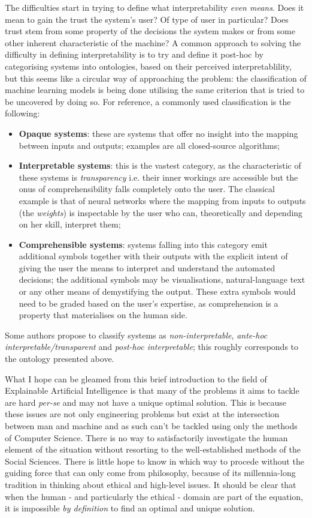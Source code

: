 \documentclass[mscthesis]{usiinfthesis}
\begin{document}
The difficulties start in trying to define what interpretability \textit{even means}.  Does it mean to gain the trust the system's user?  Of type of user in particular?  Does trust stem from some property of the decisions the system makes or from some other inherent characteristic of the machine?
A common approach to solving the difficulty in defining interpretability is to try and define it post-hoc by categorising systems into ontologies, based on their perceived interpretablility, but this seems like a circular way of approaching the problem: the classification of machine learning models is being done utilising the same criterion that is tried to be uncovered by doing so.
For reference, a commonly used classification is the following: 
\begin{itemize}
	\item \textbf{Opaque systems}: these are systems that offer no insight into the mapping between inputs and outputs; examples are all closed-source algorithms;
	\item \textbf{Interpretable systems}: this is the vastest category, as the characteristic of these systems is \textit{transparency} i.e. their inner workings are accessible but the onus of comprehensibility falls completely onto the user.  The classical example is that of neural networks where the mapping from inputs to outputs (the \textit{weights}) is inspectable by the user who can, theoretically and depending on her skill, interpret them;
	\item \textbf{Comprehensible systems}: systems falling into this category emit additional symbols together with their outputs with the explicit intent of giving the user the means to interpret and understand the automated decisions; the additional symbols may be visualisations, natural-language text or any other means of demystifying the output.  These extra symbols would need to be graded based on the user's expertise, as comprehension is a property that materialises on the human side.
\end{itemize}
Some authors propose to classify systems as \textit{non-interpretable}, \textit{ante-hoc interpretable/transparent} and \textit{post-hoc interpretable}; this roughly corresponds to the ontology presented above.

What I hope can be gleamed from this brief introduction to the field of Explainable Artificial Intelligence is that many of the problems it aims to tackle are hard \textit{per-se} and may not have a unique optimal solution.  This is because these issues are not only engineering problems but exist at the intersection between man and machine and as such can't be tackled using only the methods of Computer Science.  There is no way to satisfactorily investigate the human element of the situation without resorting to the well-established methods of the Social Sciences.  There is little hope to know in which way to procede without the guiding force that can only come from philosophy, because of its millennia-long tradition in thinking about ethical and high-level issues.  
It should be clear that when the human - and particularly the ethical - domain are part of the equation, it is impossible \textit{by definition} to find an optimal and unique solution.
\end{document}
